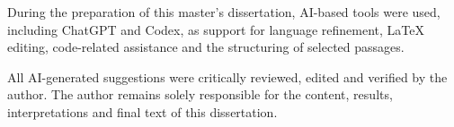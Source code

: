 During the preparation of this master's dissertation, AI-based tools were used, including ChatGPT and Codex, as support for language refinement, LaTeX editing, code-related assistance and the structuring of selected passages.

All AI-generated suggestions were critically reviewed, edited and verified by the author. The author remains solely responsible for the content, results, interpretations and final text of this dissertation.
